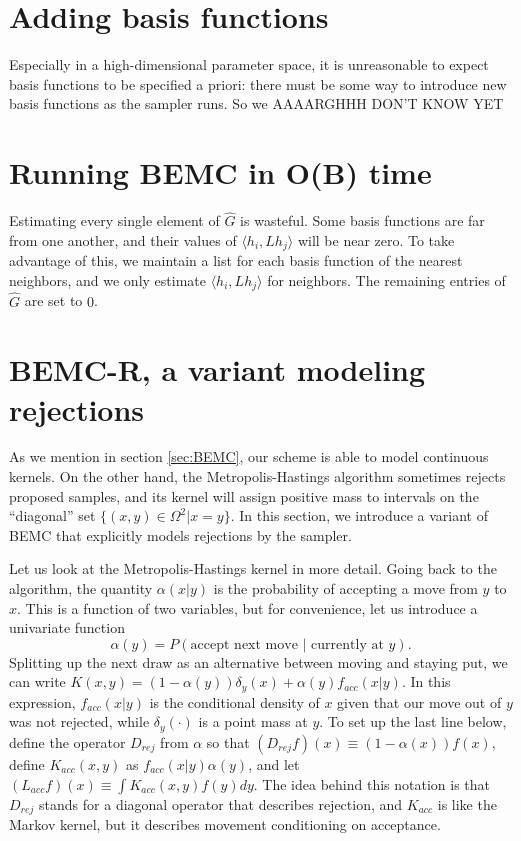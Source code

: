 \documentclass{article}
\begin{document}
\section{Adding basis functions}
\label{sec:reverse_jumps}

Especially in a high-dimensional parameter space, it is unreasonable to expect basis functions to be specified a priori: there must be some way to introduce new basis functions as the sampler runs. So we AAAARGHHH DON'T KNOW YET

\section{Running BEMC in O(B) time}
\label{sec:linear_time}

Estimating every single element of $\hat G$ is wasteful. Some basis functions are far from one another, and their values of $\langle h_i, Lh_j \rangle$ will be near zero. To take advantage of this, we maintain a list for each basis function of the nearest neighbors, and we only estimate $\langle h_i, Lh_j \rangle$ for neighbors. The remaining entries of $\hat G$ are set to $0$. 

\section{BEMC-R, a variant modeling rejections}
\label{sec:BEMC-R}

As we mention in section \ref{sec:BEMC}, our scheme is able to model continuous kernels. On the other hand, the Metropolis-Hastings algorithm sometimes rejects proposed samples, and its kernel will assign positive mass to intervals on the ``diagonal'' set $\{(x,y) \in \Omega^2 | x=y\}$. In this section, we introduce a variant of BEMC that explicitly models rejections by the sampler. 

Let us look at the Metropolis-Hastings kernel in more detail. Going back to the algorithm, the quantity $\alpha(x|y)$ is the probability of accepting a move from $y$ to $x$. This is a function of two variables, but for convenience, let us introduce a univariate function $$\alpha(y)=P(\text{accept next move $|$ currently at }y).$$ Splitting up the next draw as an alternative between moving and staying put, we can write $K(x, y) = (1-\alpha(y))\delta_{y}(x) + \alpha(y)f_{acc}(x|y)$. In this expression, $f_{acc}(x|y)$ is the conditional density of $x$ given that our move out of $y$ was not rejected, while $\delta_y(\cdot)$ is a point mass at $y$. %
To set up the last line below, define the operator $D_{rej}$ from $\alpha$ so that $(D_{rej}f)(x)\equiv (1-\alpha(x))f(x)$, define $K_{acc}(x,y)$ as $f_{acc}(x|y)\alpha(y)$, and let $(L_{acc}f)(x)\equiv \int K_{acc}(x,y)f(y)dy$. The idea behind this notation is that $D_{rej}$ stands for a diagonal operator that describes rejection, and $K_{acc}$ is like the Markov kernel, but it describes movement conditioning on acceptance.
\end{document}

